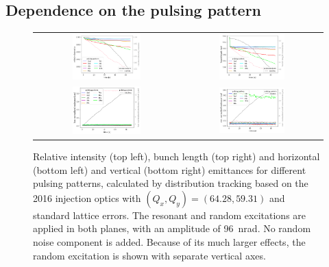 \documentclass[%
 reprint,
 amsmath,amssymb,
 aps,
prstab,
longbibliography
]{revtex4-1}
\begin{document}
\subsection{Dependence on the pulsing pattern}
\label{sec:pattern}

\begin{figure}
\begin{tabular}{cc}
\includegraphics[width=0.49\textwidth]{2016injerra2b2u_pattern_3_5um_intensity.png}
  &
\includegraphics[width=0.49\textwidth]{2016injerra2b2u_pattern_3_5um_sigm.png}
  \\
\includegraphics[width=0.49\textwidth]{2016injerra2b2u_pattern_3_5um_emit1.png} &
\includegraphics[width=0.49\textwidth]{2016injerra2b2u_pattern_3_5um_emit2.png}
  \\
\end{tabular}
\caption{Relative intensity (top left), bunch length (top right) and
  horizontal (bottom left) and vertical (bottom right) emittances for
  different pulsing patterns, calculated by distribution tracking
  based on the 2016 injection optics with
  $(Q_x, Q_y) = (64.28, 59.31)$ and standard lattice errors. The
  resonant and random excitations are applied in both planes, with an
  amplitude of 96~nrad. No random noise component is added. Because of
  its much larger effects, the random excitation is shown with
  separate vertical axes.}
\label{fig:patternsim}
\end{figure}
\end{document}
